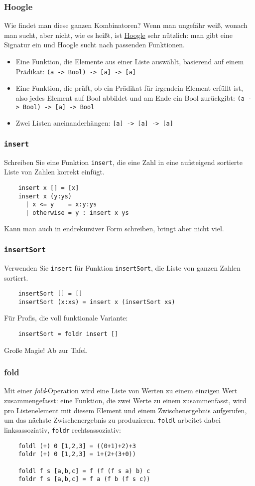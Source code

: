 \documentclass{beamer}
\begin{document}
\begin{frame}
  \frametitle{Hoogle}
  Wie findet man diese ganzen Kombinatoren?
  Wenn man ungefähr weiß, wonach man sucht, aber nicht, wie es heißt, ist \underline{\href{https://www.haskell.org/hoogle/}{Hoogle}} sehr nützlich:
  man gibt eine Signatur ein und Hoogle sucht nach passenden Funktionen.
  
  \begin{itemize}
  \item Eine Funktion, die Elemente aus einer Liste auswählt, basierend auf einem Prädikat:
    \lstinline{(a -> Bool) -> [a] -> [a]}
  \item Eine Funktion, die prüft, ob ein Prädikat für irgendein Element erfüllt ist, also jedes Element auf Bool abbildet und am Ende ein Bool zurückgibt:
    \lstinline{(a -> Bool) -> [a] -> Bool}
  \item Zwei Listen aneinanderhängen:
    \lstinline{[a] -> [a] -> [a]}
  \end{itemize}
\end{frame}

\begin{frame}[fragile]
  \frametitle{\lstinline{insert}}
  Schreiben Sie eine Funktion \lstinline{insert}, die eine Zahl in eine aufsteigend sortierte Liste von Zahlen korrekt einfügt.
  \pause
  \begin{lstlisting}
    insert x [] = [x]
    insert x (y:ys)
      | x <= y    = x:y:ys
      | otherwise = y : insert x ys
  \end{lstlisting}
  Kann man auch in endrekursiver Form schreiben, bringt aber nicht viel.
\end{frame}

\begin{frame}[fragile]
  \frametitle{\lstinline{insertSort}}
  Verwenden Sie \lstinline{insert} für Funktion \lstinline{insertSort}, die Liste von ganzen Zahlen sortiert.
  \pause
  \begin{lstlisting}
    insertSort [] = []
    insertSort (x:xs) = insert x (insertSort xs)
  \end{lstlisting}
  \pause
  Für Profis, die voll funktionale Variante:
  \pause
  \begin{lstlisting}
    insertSort = foldr insert []
  \end{lstlisting}
  Große Magie! Ab zur Tafel.
\end{frame}

\begin{frame}[fragile]
  \frametitle{fold}
  Mit einer \emph{fold}-Operation wird eine Liste von Werten zu einem einzigen Wert zusammengefasst:
  eine Funktion, die zwei Werte zu einem zusammenfasst, wird pro Listenelement mit diesem Element und einem Zwischenergebnis aufgerufen,
  um das nächste Zwischenergebnis zu produzieren.
  \lstinline{foldl} arbeitet dabei linksassoziativ, \lstinline{foldr} rechtsassoziativ:
  \begin{lstlisting}
    foldl (+) 0 [1,2,3] = ((0+1)+2)+3
    foldr (+) 0 [1,2,3] = 1+(2+(3+0))
    
    foldl f s [a,b,c] = f (f (f s a) b) c
    foldr f s [a,b,c] = f a (f b (f s c))
  \end{lstlisting}
\end{frame}
\end{document}
